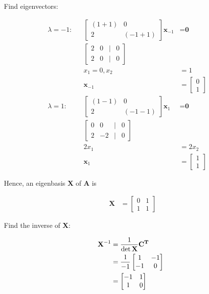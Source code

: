 \documentclass{article}
\begin{document}
Find eigenvectors:

\begin{align}
    \lambda = -1: && \begin{bmatrix}
    (1+1) & 0\\
    2 & (-1+1)
    \end{bmatrix} \textbf{x}_{-1} &= \textbf{0}
    \\
    && \begin{bmatrix}
    2 & 0 &|& 0\\
    2 & 0 &|& 0
    \end{bmatrix}
    \\
    && x_1 = 0, x_2 &= 1
    \\
    && \textbf{x}_{-1} &= \begin{bmatrix}
    0\\1
    \end{bmatrix}
    \\
    \lambda = 1: && \begin{bmatrix}
    (1-1) & 0\\
    2 & (-1-1)
    \end{bmatrix} \textbf{x}_1 &= \textbf{0}
    \\
    &&\begin{bmatrix}
    0 & 0 &|& 0\\
    2 & -2 &|& 0
    \end{bmatrix}
    \\
    && 2x_1 &= 2x_2
    \\
    && \textbf{x}_1 &= \begin{bmatrix}
    1\\1
    \end{bmatrix}
\end{align}

Hence, an eigenbasis \textbf{X} of \textbf{A} is

\begin{align}
    && \textbf{X} &= \begin{bmatrix}
    0 & 1 \\ 1 & 1
    \end{bmatrix}
\end{align}

Find the inverse of \textbf{X}:

\begin{align}
    && \textbf{X}^{-1} &= \frac{1}{\det \textbf{X}} \textbf{C\textsuperscript{T}}
    \\
    && &= \frac{1}{-1}\begin{bmatrix}
    1 & -1\\
    -1 & 0
    \end{bmatrix}
    \\
    && &= \begin{bmatrix}
    -1 & 1\\
    1 & 0
    \end{bmatrix}
\end{align}
\end{document}
